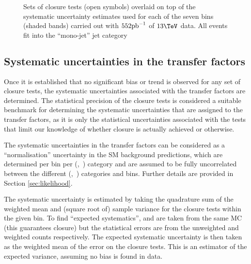 \begin{figure}[h!]
  \begin{center}
    \caption{Sets of closure tests (open symbols) overlaid on top of
      the systematic uncertainty estimates used for each of the seven
      \scalht bins (shaded bands) carried out with $552\ipb$ of
      $13\tev$ data. All events fit into the ``mono-jet'' jet
      category}
    \label{fig:closureDataMono}
  \end{center} 
\end{figure}

\subsection{Systematic uncertainties in the transfer factors\label{sec:syst-from-closure}}

Once it is established that no significant bias or trend is observed
for any set of closure tests, the systematic uncertainties associated
with the transfer factors are determined. The statistical precision of
the closure tests is considered a suitable benchmark for determining
the systematic uncertainties that are assigned to the transfer
factors, as it is only the statistical uncertainties associated with
the tests that limit our knowledge of whether closure is actually
achieved or otherwise.

The systematic uncertainties in the transfer factors can be considered
as a ``normalisation'' uncertainty in the SM background predictions,
which are determined per \scalht bin per (\njet,~\nb) category and are
assumed to be fully uncorrelated between the different (\njet,~\nb)
categories and \scalht bins. Further details are provided in Section
\ref{sec:likelihood}. 

The systematic uncertainty is estimated by taking the quadrature sum
of the weighted mean and (square root of) sample variance for the
closure tests within the given \scalht bin. To find ``expected
systematics'', \nobs and \npre are taken from the same MC
(this guarantees closure) but the statistical errors are from the
unweighted and weighted counts respectively. The expected systematic
uncertainty is then taken as the weighted mean of the error on the
closure tests. This is an estimator of the expected variance, assuming
no bias is found in data. 

